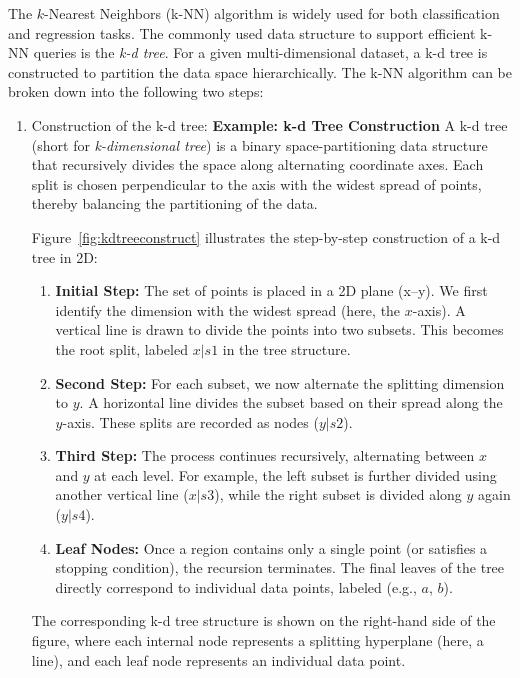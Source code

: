 \documentclass[12pt]{book}
\begin{document}
The $k$-Nearest Neighbors (k-NN) algorithm is widely used for both classification and regression tasks. The commonly used data structure to support efficient k-NN queries is the \textit{k-d tree}. For a given multi-dimensional dataset, a k-d tree is constructed to partition the data space hierarchically. The k-NN algorithm can be broken down into the following two steps:
\begin{enumerate}
    \item Construction of the k-d tree:
    \textbf{Example: k-d Tree Construction}
A k-d tree (short for \textit{k-dimensional tree}) is a binary space-partitioning data structure that recursively divides the space along alternating coordinate axes. Each split is chosen perpendicular to the axis with the widest spread of points, thereby balancing the partitioning of the data.

Figure~\ref{fig:kdtreeconstruct} illustrates the step-by-step construction of a k-d tree in 2D:

\begin{enumerate}
    \item \textbf{Initial Step:}  
    The set of points is placed in a 2D plane (x–y). We first identify the dimension with the widest spread (here, the $x$-axis). A vertical line is drawn to divide the points into two subsets. This becomes the root split, labeled $x|s1$ in the tree structure.
    
    \item \textbf{Second Step:}  
    For each subset, we now alternate the splitting dimension to $y$. A horizontal line divides the subset based on their spread along the $y$-axis. These splits are recorded as nodes ($y|s2$).
    
    \item \textbf{Third Step:}  
    The process continues recursively, alternating between $x$ and $y$ at each level. For example, the left subset is further divided using another vertical line ($x|s3$), while the right subset is divided along $y$ again ($y|s4$).
    
    \item \textbf{Leaf Nodes:}  
    Once a region contains only a single point (or satisfies a stopping condition), the recursion terminates. The final leaves of the tree directly correspond to individual data points, labeled (e.g., $a$, $b$).
\end{enumerate}

The corresponding k-d tree structure is shown on the right-hand side of the figure, where each internal node represents a splitting hyperplane (here, a line), and each leaf node represents an individual data point.


\end{enumerate}
\end{document}
